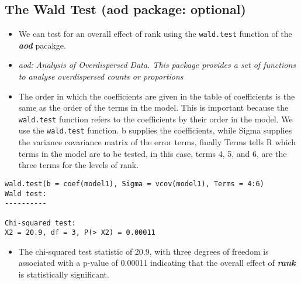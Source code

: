 \subsection{The Wald Test (aod package: optional)}
\begin{itemize}
\item We can test for an overall effect of rank using the \texttt{wald.test} function of the \textbf{\textit{aod}} pacakge. 
\item \textit{aod: Analysis of Overdispersed Data. This package provides a set of functions to analyse overdispersed counts or proportions}
\item The order in which the coefficients are given in the table of coefficients is the same as the order of the terms in the model. This is important because the \texttt{wald.test} function refers to the coefficients by their order in the model. We use the \texttt{wald.test} function. b supplies the coefficients, while Sigma supplies the variance covariance matrix of the error terms, finally Terms tells R which terms in the model are to be tested, in this case, terms 4, 5, and 6, are the three terms for the levels of rank.
\end{itemize}
\begin{framed}
\begin{verbatim}
wald.test(b = coef(model1), Sigma = vcov(model1), Terms = 4:6)
Wald test:
----------

Chi-squared test:
X2 = 20.9, df = 3, P(> X2) = 0.00011
\end{verbatim}
\end{framed}
\begin{itemize}
\item The chi-squared test statistic of 20.9, with three degrees of freedom is associated with a p-value of 0.00011 indicating that the overall effect of \textbf{\textit{rank}} is statistically significant.
\end{itemize}

